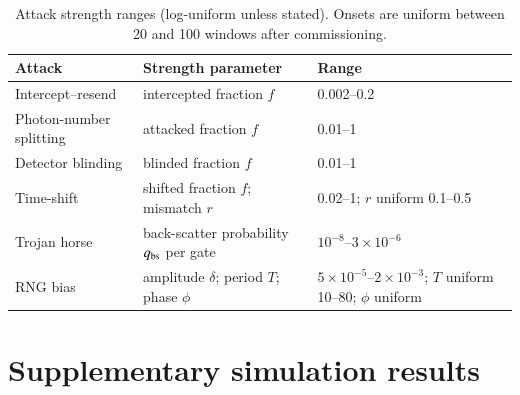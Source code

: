 \begin{table}[h]
\centering
\caption{Attack strength ranges (log-uniform unless stated). Onsets are uniform between 20 and 100 windows after commissioning.}
\label{tab:attackranges}
\small
\begin{tabular}{@{}lll@{}}
\toprule
Attack & Strength parameter & Range \\
\midrule
Intercept--resend & intercepted fraction $f$ & 0.002--0.2 \\
Photon-number splitting & attacked fraction $f$ & 0.01--1 \\
Detector blinding & blinded fraction $f$ & 0.01--1 \\
Time-shift & shifted fraction $f$; mismatch $r$ & 0.02--1; $r$ uniform 0.1--0.5 \\
Trojan horse & back-scatter probability $q_{\rm bs}$ per gate & $10^{-8}$--$3\times10^{-6}$ \\
RNG bias & amplitude $\delta$; period $T$; phase $\phi$ & $5\times10^{-5}$--$2\times10^{-3}$; $T$ uniform 10--80; $\phi$ uniform \\
\bottomrule
\end{tabular}
\end{table}

\section{Supplementary simulation results}\label{app:results}

\begin{table}[h]
\centering
\caption{Window-level AUROC by attack group (attack-active windows against windows of attack-free test links). Mean\,$\pm$\,95\,\% confidence interval over held-out seeds.}
\label{tab:auroc}
\small

\end{table}

\begin{table}[h]
\centering
\caption{As \cref{tab:detection}, at a per-window false-alarm rate of $10^{-2}$.}
\label{tab:detection2}
\small
\resizebox{\textwidth}{!}{}
\end{table}

\begin{table}[h]
\centering
\caption{Test-split attacks at a per-window false-alarm rate of $10^{-3}$: percentage of runs detected, median delay of detected runs, and mean key generated between onset and first alarm (or end of run).}
\label{tab:delaykey}
\small

\end{table}

